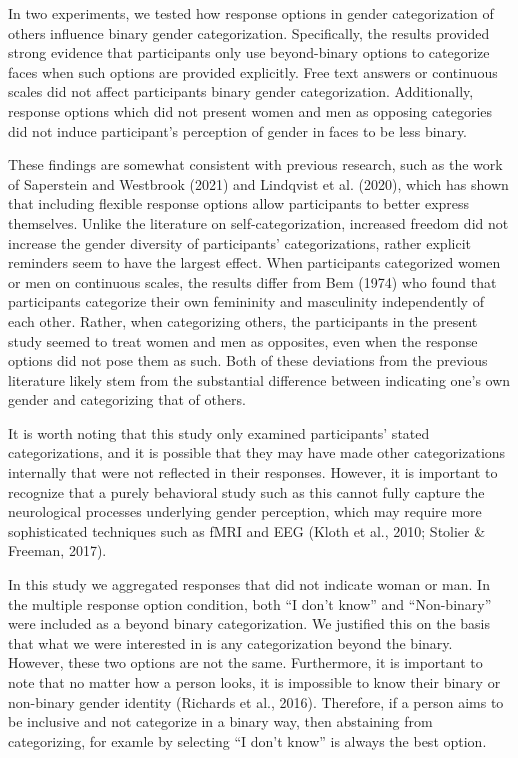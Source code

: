 \documentclass[
  man]{apa7}
\begin{document}
In two experiments, we tested how response options in gender categorization of others influence binary gender categorization. Specifically, the results provided strong evidence that participants only use beyond-binary options to categorize faces when such options are provided explicitly. Free text answers or continuous scales did not affect participants binary gender categorization. Additionally, response options which did not present women and men as opposing categories did not induce participant's perception of gender in faces to be less binary.

These findings are somewhat consistent with previous research, such as the work of Saperstein and Westbrook (2021) and Lindqvist et al. (2020), which has shown that including flexible response options allow participants to better express themselves. Unlike the literature on self-categorization, increased freedom did not increase the gender diversity of participants' categorizations, rather explicit reminders seem to have the largest effect. When participants categorized women or men on continuous scales, the results differ from Bem (1974) who found that participants categorize their own femininity and masculinity independently of each other. Rather, when categorizing others, the participants in the present study seemed to treat women and men as opposites, even when the response options did not pose them as such. Both of these deviations from the previous literature likely stem from the substantial difference between indicating one's own gender and categorizing that of others.

It is worth noting that this study only examined participants' stated categorizations, and it is possible that they may have made other categorizations internally that were not reflected in their responses. However, it is important to recognize that a purely behavioral study such as this cannot fully capture the neurological processes underlying gender perception, which may require more sophisticated techniques such as fMRI and EEG (Kloth et al., 2010; Stolier \& Freeman, 2017).

In this study we aggregated responses that did not indicate woman or man. In the multiple response option condition, both ``I don't know'' and ``Non-binary'' were included as a beyond binary categorization. We justified this on the basis that what we were interested in is any categorization beyond the binary. However, these two options are not the same. Furthermore, it is important to note that no matter how a person looks, it is impossible to know their binary or non-binary gender identity (Richards et al., 2016). Therefore, if a person aims to be inclusive and not categorize in a binary way, then abstaining from categorizing, for examle by selecting ``I don't know'' is always the best option.
\end{document}

